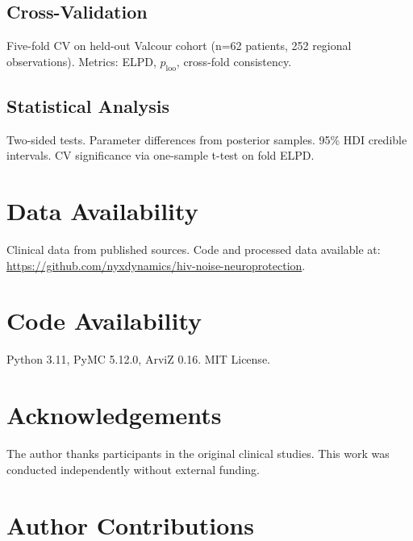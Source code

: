\documentclass[10pt,a4paper]{article}
\begin{document}
\subsection{Cross-Validation}

Five-fold CV on held-out Valcour cohort (n=62 patients, 252 regional observations). Metrics: ELPD, $p_{\text{loo}}$, cross-fold consistency.

\subsection{Statistical Analysis}

Two-sided tests. Parameter differences from posterior samples. 95\% HDI credible intervals. CV significance via one-sample t-test on fold ELPD.

\section*{Data Availability}

Clinical data from published sources\cite{sailasuta2012,young2014,valcour2012}. Code and processed data available at: \url{https://github.com/nyxdynamics/hiv-noise-neuroprotection}.

\section*{Code Availability}

Python 3.11, PyMC 5.12.0, ArviZ 0.16. MIT License.

\section*{Acknowledgements}

The author thanks participants in the original clinical studies. This work was conducted independently without external funding.

\section*{Author Contributions}
\end{document}
